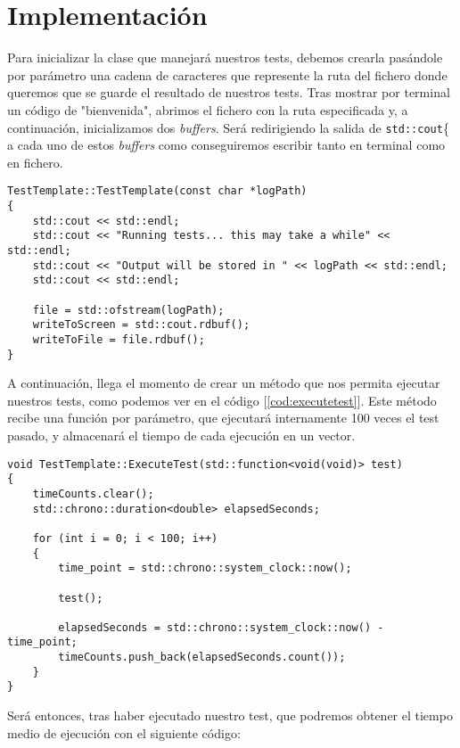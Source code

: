 \section{Implementación}

Para inicializar la clase que manejará nuestros tests, debemos crearla pasándole por parámetro una cadena de caracteres que represente la ruta del fichero donde queremos que se guarde el resultado de nuestros tests. Tras mostrar por terminal un código de "bienvenida", abrimos el fichero con la ruta especificada y, a continuación, inicializamos dos \emph{buffers}. Será redirigiendo la salida de \lstinline{std::cout}\{ a cada uno de estos \emph{buffers} como conseguiremos escribir tanto en terminal como en fichero.

\begin{lstlisting}[style=C-color, caption={Constructor de nuestra clase para manejar tests}, label=cod:testtemplate, escapechar=|]
TestTemplate::TestTemplate(const char *logPath)
{
    std::cout << std::endl;
    std::cout << "Running tests... this may take a while" << std::endl;
    std::cout << "Output will be stored in " << logPath << std::endl;
    std::cout << std::endl;

    file = std::ofstream(logPath);
    writeToScreen = std::cout.rdbuf();
    writeToFile = file.rdbuf();
}
\end{lstlisting}

A continuación, llega el momento de crear un método que nos permita ejecutar nuestros tests, como podemos ver en el código [\ref{cod:executetest}]. Este método recibe una función por parámetro, que ejecutará internamente 100 veces el test pasado,  y almacenará el tiempo de cada ejecución en un vector.

\begin{lstlisting}[style=C-color, caption={Método para ejecutar un test}, label=cod:executetest, escapechar=|]
void TestTemplate::ExecuteTest(std::function<void(void)> test)
{
    timeCounts.clear();
    std::chrono::duration<double> elapsedSeconds;

    for (int i = 0; i < 100; i++)
    {
        time_point = std::chrono::system_clock::now();

        test();

        elapsedSeconds = std::chrono::system_clock::now() - time_point;
        timeCounts.push_back(elapsedSeconds.count());
    }
}
\end{lstlisting}

Será entonces, tras haber ejecutado nuestro test, que podremos obtener el tiempo medio de ejecución con el siguiente código:

